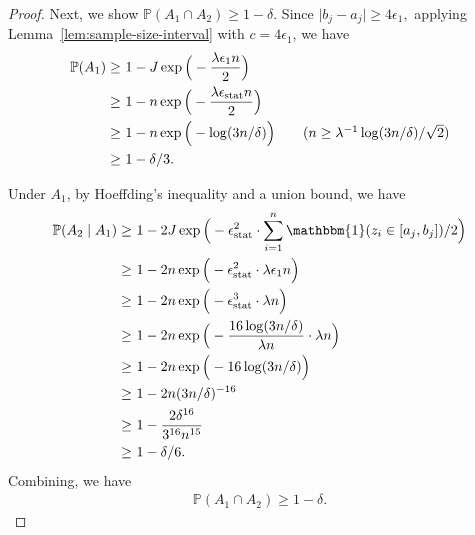 \documentclass[11pt]{article}
\theoremstyle{statplain}
\theoremstyle{statdefinition}
\newcommand{\stat}{\mathrm{stat}}
\newcommand{\PP}{\mathbb{P}}
\newcommand{\0}{\mathbf{0}}
\begin{document}
\begin{proof}
Next, we show $\PP(A_1\cap A_2)\ge 1-\delta$. Since 
$
    \Big|b_j - a_j\Big| \geq 4\epsilon_1,
$ 
applying Lemma~\ref{lem:sample-size-interval} with $c=4\epsilon_1$, 
we have 
\begin{align*}
    \PP(A_1) \geq &~ 1-J\exp\Big(-\frac{\lambda\epsilon_1 n}{2}\Big)\\
    \geq &~ 1- n\exp\Big(-\frac{\lambda\epsilon_\stat n}{2}\Big)\\
    \geq &~ 1- n\exp\Big(-\log(3n/\delta)\Big) \tag{$n \geq \lambda^{-1} \log(3n/\delta) / \sqrt{2}$}\\
    \geq &~ 1-\delta/3 .
\end{align*}

Under $A_1$, by Hoeffding's inequality and a union bound, we have
\begin{align*}
    \PP(A_2\mid A_1) \geq &~ 1- 2 J\exp\Big(-\epsilon_\stat^2 \cdot\sum_{i=1}^n \mathbbm{1}(z_i \in [a_j,b_j])/2\Big)\\
    \geq &~ 1- 2 n\exp\Big(-\epsilon_\stat^2 \cdot \lambda \epsilon_1 n\Big)\\
    \geq &~ 1- 2 n\exp\Big(-\epsilon_\stat^3 \cdot \lambda  n\Big)\\
    \geq &~ 1- 2 n\exp\Big(- \frac{16\log(3n/\delta)}{\lambda n } \cdot \lambda  n\Big)\\
    \geq &~ 1- 2 n\exp\Big(- 16\log(3n/\delta)\Big)\\
    \geq &~ 1- 2 n (3n/\delta)^{- 16}\\
    \geq &~ 1- \frac{2 \delta^{16}}{3^{16} n^{15}}\\
    \geq &~ 1-\delta/6.
\end{align*}
Combining, we have
\begin{align*}
    \PP(A_1 \cap A_2) \geq 1 - \delta.
\end{align*}


\end{proof}
\end{document}
